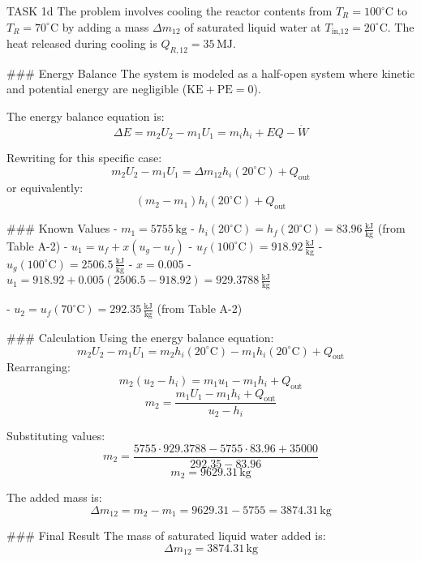 TASK 1d  
The problem involves cooling the reactor contents from \( T_R = 100^\circ\text{C} \) to \( T_R = 70^\circ\text{C} \) by adding a mass \( \Delta m_{12} \) of saturated liquid water at \( T_{\text{in,12}} = 20^\circ\text{C} \). The heat released during cooling is \( Q_{R,12} = 35 \, \text{MJ} \).  

### Energy Balance  
The system is modeled as a half-open system where kinetic and potential energy are negligible (\( \text{KE} + \text{PE} = 0 \)).  

The energy balance equation is:  
\[
\Delta E = m_2 U_2 - m_1 U_1 = m_i h_i + EQ - \dot{W}
\]  

Rewriting for this specific case:  
\[
m_2 U_2 - m_1 U_1 = \Delta m_{12} h_i(20^\circ\text{C}) + Q_{\text{out}}
\]  
or equivalently:  
\[
(m_2 - m_1) h_i(20^\circ\text{C}) + Q_{\text{out}}
\]  

### Known Values  
- \( m_1 = 5755 \, \text{kg} \)  
- \( h_i(20^\circ\text{C}) = h_f(20^\circ\text{C}) = 83.96 \, \frac{\text{kJ}}{\text{kg}} \) (from Table A-2)  
- \( u_1 = u_f + x(u_g - u_f) \)  
  - \( u_f(100^\circ\text{C}) = 918.92 \, \frac{\text{kJ}}{\text{kg}} \)  
  - \( u_g(100^\circ\text{C}) = 2506.5 \, \frac{\text{kJ}}{\text{kg}} \)  
  - \( x = 0.005 \)  
  - \( u_1 = 918.92 + 0.005(2506.5 - 918.92) = 929.3788 \, \frac{\text{kJ}}{\text{kg}} \)  

- \( u_2 = u_f(70^\circ\text{C}) = 292.35 \, \frac{\text{kJ}}{\text{kg}} \) (from Table A-2)  

### Calculation  
Using the energy balance equation:  
\[
m_2 U_2 - m_1 U_1 = m_2 h_i(20^\circ\text{C}) - m_1 h_i(20^\circ\text{C}) + Q_{\text{out}}
\]  
Rearranging:  
\[
m_2 (u_2 - h_i) = m_1 u_1 - m_1 h_i + Q_{\text{out}}
\]  
\[
m_2 = \frac{m_1 U_1 - m_1 h_i + Q_{\text{out}}}{u_2 - h_i}
\]  

Substituting values:  
\[
m_2 = \frac{5755 \cdot 929.3788 - 5755 \cdot 83.96 + 35000}{292.35 - 83.96}
\]  
\[
m_2 = 9629.31 \, \text{kg}
\]  

The added mass is:  
\[
\Delta m_{12} = m_2 - m_1 = 9629.31 - 5755 = 3874.31 \, \text{kg}
\]  

### Final Result  
The mass of saturated liquid water added is:  
\[
\Delta m_{12} = 3874.31 \, \text{kg}
\]